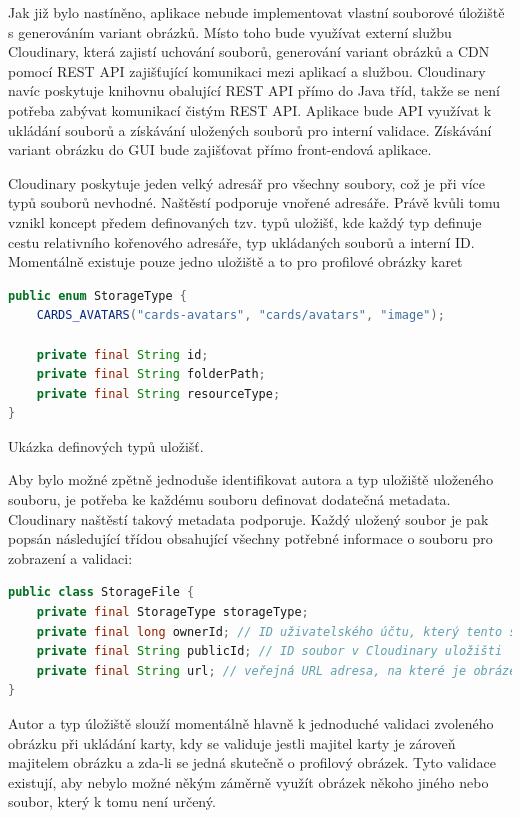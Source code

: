 \begin{itemize}
\begin{itemize}
		Jak již bylo nastíněno, aplikace nebude implementovat vlastní souborové úložiště s generováním variant obrázků.
		Místo toho bude využívat externí službu Cloudinary, která zajistí uchování souborů, generování variant obrázků
		a \ac{CDN} pomocí \ac{REST} \ac{API} zajišťující komunikaci mezi aplikací a službou.
		Cloudinary navíc poskytuje knihovnu obalující \ac{REST} \ac{API} přímo do Java tříd, takže se není potřeba zabývat
		komunikací čistým \ac{REST} \ac{API}.
		Aplikace bude \ac{API} využívat k ukládání souborů a získávání uložených souborů pro interní validace.
		Získávání variant obrázku do \ac{GUI} bude zajišťovat přímo front-endová aplikace.

		Cloudinary poskytuje jeden velký adresář pro všechny soubory, což je při více typů souborů nevhodné.
		Naštěstí podporuje vnořené adresáře.
		Právě kvůli tomu vznikl koncept předem definovaných tzv. typů uložišť, kde každý typ definuje cestu
		relativního kořenového adresáře, typ ukládaných souborů a interní ID.
		Momentálně existuje pouze jedno uložiště a to pro profilové obrázky karet

		\begin{lstlisting}[language=Java]
public enum StorageType {
    CARDS_AVATARS("cards-avatars", "cards/avatars", "image");

    private final String id;
    private final String folderPath;
    private final String resourceType;
}
		\end{lstlisting}
		Ukázka definových typů uložišť. %

		Aby bylo možné zpětně jednoduše identifikovat autora a typ uložiště uloženého souboru, je potřeba ke každému
		souboru definovat dodatečná metadata.
		Cloudinary naštěstí takový metadata podporuje.
		Každý uložený soubor je pak popsán následující třídou obsahující všechny potřebné informace o souboru pro zobrazení
		a validaci:
		\begin{lstlisting}[language=Java]
public class StorageFile {
    private final StorageType storageType;
    private final long ownerId; // ID uživatelského účtu, který tento soubor nahrál
    private final String publicId; // ID soubor v Cloudinary uložišti
    private final String url; // veřejná URL adresa, na které je obrázek možné zobrazit
}
		\end{lstlisting}
		Autor a typ úložiště slouží momentálně hlavně k jednoduché validaci zvoleného obrázku při ukládání karty, kdy
		se validuje jestli majitel karty je zároveň majitelem obrázku a zda-li se jedná skutečně o profilový obrázek.
		Tyto validace existují, aby nebylo možné někým záměrně využít obrázek někoho jiného nebo soubor, který k tomu
		není určený.


\end{itemize}
\end{itemize}
